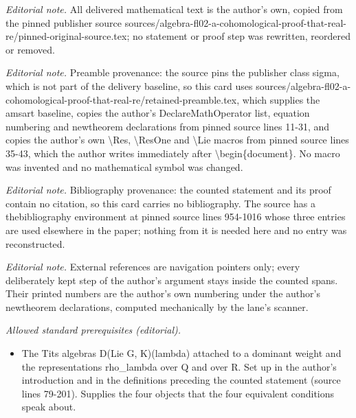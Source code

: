 \maketitle
\noindent\textit{Editorial note.} All delivered mathematical text is the author's own, copied from the pinned publisher source sources/algebra-fl02-a-cohomological-proof-that-real-re/pinned-original-source.tex; no statement or proof step was rewritten, reordered or removed.\par\medskip
\noindent\textit{Editorial note.} Preamble provenance: the source pins the publisher class sigma, which is not part of the delivery baseline, so this card uses sources/algebra-fl02-a-cohomological-proof-that-real-re/retained-preamble.tex, which supplies the amsart baseline, copies the author's DeclareMathOperator list, equation numbering and newtheorem declarations from pinned source lines 11-31, and copies the author's own \textbackslash{}Res, \textbackslash{}ResOne and \textbackslash{}Lie macros from pinned source lines 35-43, which the author writes immediately after \textbackslash{}begin\{document\}. No macro was invented and no mathematical symbol was changed.\par\medskip
\noindent\textit{Editorial note.} Bibliography provenance: the counted statement and its proof contain no citation, so this card carries no bibliography. The source has a thebibliography environment at pinned source lines 954-1016 whose three entries are used elsewhere in the paper; nothing from it is needed here and no entry was reconstructed.\par\medskip
\noindent\textit{Editorial note.} External references are navigation pointers only; every deliberately kept step of the author's argument stays inside the counted spans. Their printed numbers are the author's own numbering under the author's newtheorem declarations, computed mechanically by the lane's scanner.\par\medskip
\noindent\textit{Allowed standard prerequisites (editorial).}\begin{itemize}
\item The Tits algebras D(Lie G, K)(lambda) attached to a dominant weight and the representations rho\_lambda over Q and over R. Set up in the author's introduction and in the definitions preceding the counted statement (source lines 79-201). Supplies the four objects that the four equivalent conditions speak about.
\end{itemize}\medskip
